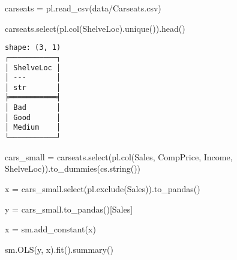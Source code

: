 \documentclass[
  letterpaper,
  DIV=11,
  numbers=noendperiod]{scrreprt}
\newenvironment{Shaded}{\begin{snugshade}}{\end{snugshade}}
\newcommand{\NormalTok}[1]{\textcolor[rgb]{0.00,0.23,0.31}{#1}}
\newcommand{\OperatorTok}[1]{\textcolor[rgb]{0.37,0.37,0.37}{#1}}
\newcommand{\StringTok}[1]{\textcolor[rgb]{0.13,0.47,0.30}{#1}}
\begin{document}
\begin{Shaded}
\begin{Highlighting}[]
\NormalTok{carseats }\OperatorTok{=}\NormalTok{ pl.read\_csv(}\StringTok{\textquotesingle{}data/Carseats.csv\textquotesingle{}}\NormalTok{)}

\NormalTok{carseats.select(pl.col(}\StringTok{\textquotesingle{}ShelveLoc\textquotesingle{}}\NormalTok{).unique()).head()}
\end{Highlighting}
\end{Shaded}

\begin{verbatim}
shape: (3, 1)
┌───────────┐
│ ShelveLoc │
│ ---       │
│ str       │
╞═══════════╡
│ Bad       │
│ Good      │
│ Medium    │
└───────────┘
\end{verbatim}

\begin{Shaded}
\begin{Highlighting}[]
\NormalTok{cars\_small }\OperatorTok{=}\NormalTok{ carseats.select(pl.col(}\StringTok{\textquotesingle{}Sales\textquotesingle{}}\NormalTok{, }\StringTok{\textquotesingle{}CompPrice\textquotesingle{}}\NormalTok{, }\StringTok{\textquotesingle{}Income\textquotesingle{}}\NormalTok{, }\StringTok{\textquotesingle{}ShelveLoc\textquotesingle{}}\NormalTok{)).to\_dummies(cs.string())}

\NormalTok{x }\OperatorTok{=}\NormalTok{ cars\_small.select(pl.exclude(}\StringTok{\textquotesingle{}Sales\textquotesingle{}}\NormalTok{)).to\_pandas()}

\NormalTok{y }\OperatorTok{=}\NormalTok{ cars\_small.to\_pandas()[}\StringTok{\textquotesingle{}Sales\textquotesingle{}}\NormalTok{]}

\NormalTok{x }\OperatorTok{=}\NormalTok{ sm.add\_constant(x)}

\NormalTok{sm.OLS(y, x).fit().summary()}
\end{Highlighting}
\end{Shaded}
\end{document}
